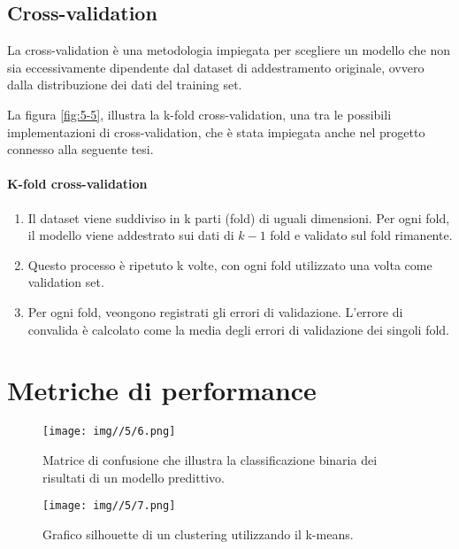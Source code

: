 \subsection{Cross-validation}

La cross-validation è una metodologia impiegata per scegliere un modello che non sia eccessivamente dipendente dal dataset di addestramento originale, ovvero dalla distribuzione dei dati del training set.

\bigskip

La figura \ref{fig:5-5}, illustra la k-fold cross-validation, una tra le possibili implementazioni di cross-validation, che è stata impiegata anche nel progetto connesso alla seguente tesi.

\paragraph{K-fold cross-validation}

\begin{enumerate}
    \item Il dataset viene suddiviso in k parti (fold) di uguali dimensioni. Per ogni fold, il modello viene addestrato sui dati di \( k-1 \) fold e validato sul fold rimanente.
    \item Questo processo è ripetuto k volte, con ogni fold utilizzato una volta come validation set.
    \item Per ogni fold, veongono registrati gli errori di validazione. L'errore di convalida è calcolato come la media degli errori di validazione dei singoli fold.
\end{enumerate}

\section{Metriche di performance}

\begin{figure}[t]
    \begin{multicols}{2}
        \centering
        \texttt{[image: img//5/6.png]}
        \caption{Matrice di confusione che illustra la classificazione binaria dei risultati di un modello predittivo.}
        \label{fig:5-6}
        
        \columnbreak
        
        \texttt{[image: img//5/7.png]}
        \caption{Grafico silhouette di un clustering utilizzando il k-means.}
        \label{fig:5-7}
    \end{multicols}
\end{figure}

